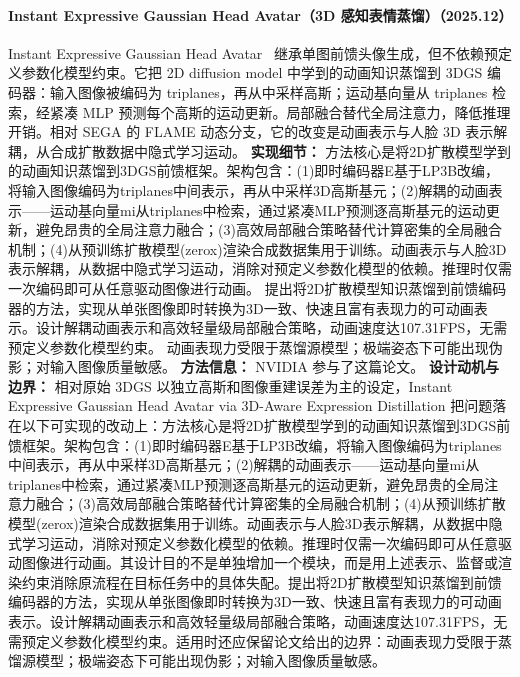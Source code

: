 \paragraph{Instant Expressive Gaussian Head Avatar（3D 感知表情蒸馏）（2025.12）}
Instant Expressive Gaussian Head Avatar~\cite{2512_16893} 继承单图前馈头像生成，但不依赖预定义参数化模型约束。它把 2D diffusion model 中学到的动画知识蒸馏到 3DGS 编码器：输入图像被编码为 triplanes，再从中采样高斯；运动基向量从 triplanes 检索，经紧凑 MLP 预测每个高斯的运动更新。局部融合替代全局注意力，降低推理开销。相对 SEGA 的 FLAME 动态分支，它的改变是动画表示与人脸 3D 表示解耦，从合成扩散数据中隐式学习运动。
\textbf{实现细节：} 方法核心是将2D扩散模型学到的动画知识蒸馏到3DGS前馈框架。架构包含：(1)即时编码器E基于LP3B改编，将输入图像编码为triplanes中间表示，再从中采样3D高斯基元；(2)解耦的动画表示——运动基向量mi从triplanes中检索，通过紧凑MLP预测逐高斯基元的运动更新，避免昂贵的全局注意力融合；(3)高效局部融合策略替代计算密集的全局融合机制；(4)从预训练扩散模型(zerox)渲染合成数据集用于训练。动画表示与人脸3D表示解耦，从数据中隐式学习运动，消除对预定义参数化模型的依赖。推理时仅需一次编码即可从任意驱动图像进行动画。 提出将2D扩散模型知识蒸馏到前馈编码器的方法，实现从单张图像即时转换为3D一致、快速且富有表现力的可动画表示。设计解耦动画表示和高效轻量级局部融合策略，动画速度达107.31FPS，无需预定义参数化模型约束。 动画表现力受限于蒸馏源模型；极端姿态下可能出现伪影；对输入图像质量敏感。
\textbf{方法信息：} NVIDIA 参与了这篇论文。
\textbf{设计动机与边界：} 相对原始 3DGS 以独立高斯和图像重建误差为主的设定，Instant Expressive Gaussian Head Avatar via 3D-Aware Expression Distillation 把问题落在以下可实现的改动上：方法核心是将2D扩散模型学到的动画知识蒸馏到3DGS前馈框架。架构包含：(1)即时编码器E基于LP3B改编，将输入图像编码为triplanes中间表示，再从中采样3D高斯基元；(2)解耦的动画表示——运动基向量mi从triplanes中检索，通过紧凑MLP预测逐高斯基元的运动更新，避免昂贵的全局注意力融合；(3)高效局部融合策略替代计算密集的全局融合机制；(4)从预训练扩散模型(zerox)渲染合成数据集用于训练。动画表示与人脸3D表示解耦，从数据中隐式学习运动，消除对预定义参数化模型的依赖。推理时仅需一次编码即可从任意驱动图像进行动画。其设计目的不是单独增加一个模块，而是用上述表示、监督或渲染约束消除原流程在目标任务中的具体失配。提出将2D扩散模型知识蒸馏到前馈编码器的方法，实现从单张图像即时转换为3D一致、快速且富有表现力的可动画表示。设计解耦动画表示和高效轻量级局部融合策略，动画速度达107.31FPS，无需预定义参数化模型约束。适用时还应保留论文给出的边界：动画表现力受限于蒸馏源模型；极端姿态下可能出现伪影；对输入图像质量敏感。
